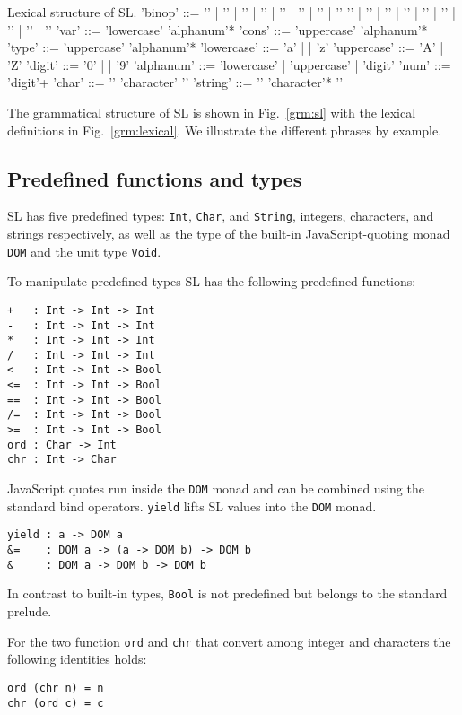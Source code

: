 \documentclass{article}
\begin{document}
\begin{grammarfigure}{Lexical structure of SL.}
  'binop' ::= '\addint' | '\subint' | '\mulint' | '\divint' | '\ltint' | '\leint' | '\eqint' | '\neint'
  \alt '\geint' | '\gtint' | '\exclamationOp' | '\paragraphOp' | '\percentOp' | '\ampOp' | '\questionOp' | '\sharpOp' | '\pipeOp'
  'var' ::= 'lowercase' 'alphanum'*
  'cons' ::= 'uppercase' 'alphanum'*
  'type' ::= 'uppercase' 'alphanum'*
  'lowercase' ::= 'a' | \cdots | 'z'
  'uppercase' ::= 'A' | \cdots | 'Z'
  'digit' ::= '0' | \cdots | '9'
  'alphanum' ::= 'lowercase' | 'uppercase' | 'digit'
  'num' ::= 'digit'+
  'char' ::= '\squote' 'character' '\squote'
  'string' ::= '\dquote' 'character'* '\dquote'
\end{grammarfigure}


The grammatical structure of SL is shown in Fig.~\ref{grm:sl} with the
lexical definitions in Fig.~\ref{grm:lexical}. We illustrate the
different phrases by example.


\subsection{Predefined functions and types}
\label{sec:pred-funct-types}

SL has five predefined types: \verb|Int|, \verb|Char|, and
\verb|String|, integers, characters, and strings respectively, as well
as the type of the built-in JavaScript-quoting monad \verb|DOM| and
the unit type \verb|Void|.

\newpage

\noindent To manipulate predefined types SL has the following
predefined functions:
\begin{verbatim}
+   : Int -> Int -> Int
-   : Int -> Int -> Int
*   : Int -> Int -> Int
/   : Int -> Int -> Int
<   : Int -> Int -> Bool
<=  : Int -> Int -> Bool
==  : Int -> Int -> Bool
/=  : Int -> Int -> Bool
>=  : Int -> Int -> Bool
ord : Char -> Int
chr : Int -> Char
\end{verbatim}
JavaScript quotes run inside the \verb|DOM| monad and can be combined
using the standard bind operators. \verb|yield| lifts SL values into
the \verb|DOM| monad.
\begin{verbatim}
yield : a -> DOM a
&=    : DOM a -> (a -> DOM b) -> DOM b
&     : DOM a -> DOM b -> DOM b
\end{verbatim}
In contrast to built-in types, \verb|Bool| is not predefined but
belongs to the standard prelude.

For the two function \verb|ord| and \verb|chr| that convert among
integer and characters the following identities holds:
\begin{verbatim}
ord (chr n) = n
chr (ord c) = c
\end{verbatim}
\end{document}
